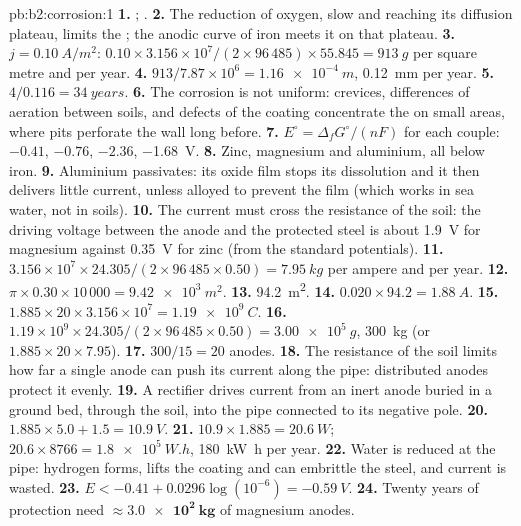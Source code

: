 \begin{solution}{pb:b2:corrosion:1}
\textbf{1.} ; .
\textbf{2.} The reduction of oxygen, slow and reaching its diffusion plateau,
limits the ; the anodic curve of iron meets it on that plateau.
\textbf{3.} $j = \qty{0.10}{A/m^2}$: $0.10 \times 3.156 \times 10^7/(2 \times 96\,485)
\times 55.845 = \qty{913}{g}$ per square metre and per year.
\textbf{4.} $913/7.87 \times 10^6 = \qty{1.16e-4}{m}$, \qty{0.12}{mm} per year.
\textbf{5.} $4/0.116 = \qty{34}{years}$.
\textbf{6.} The corrosion is not uniform: crevices, differences of aeration
between soils, and defects of the coating concentrate the  on
small areas, where pits perforate the wall long before.
\textbf{7.} $E^\circ = \Delta_f G^\circ/(nF)$ for each couple:  $-0.41$,  $-0.76$,
 $-2.36$,  \qty{-1.68}{V}.
\textbf{8.} Zinc, magnesium and aluminium, all below iron.
\textbf{9.} Aluminium passivates: its oxide film stops its dissolution and it
then delivers little current, unless alloyed to prevent the film (which works
in sea water, not in soils).
\textbf{10.} The current must cross the resistance of the soil: the driving
voltage between the anode and the protected steel is about \qty{1.9}{V} for
magnesium against \qty{0.35}{V} for zinc (from the standard potentials).
\textbf{11.} $3.156 \times 10^7 \times 24.305/(2 \times 96\,485 \times 0.50) =
\qty{7.95}{kg}$ per ampere and per year.
\textbf{12.} $\pi \times 0.30 \times 10\,000 = \qty{9.42e3}{m^2}$.
\textbf{13.} \qty{94.2}{m^2}.
\textbf{14.} $0.020 \times 94.2 = \qty{1.88}{A}$.
\textbf{15.} $1.885 \times 20 \times 3.156 \times 10^7 = \qty{1.19e9}{C}$.
\textbf{16.} $1.19 \times 10^9 \times 24.305/(2 \times 96\,485 \times 0.50) =
\qty{3.00e5}{g}$, \qty{300}{kg} (or $1.885 \times 20 \times 7.95$).
\textbf{17.} $300/15 = 20$ anodes.
\textbf{18.} The resistance of the soil limits how far a single anode can push
its current along the pipe: distributed anodes protect it evenly.
\textbf{19.} A rectifier drives current from an inert anode buried in a ground
bed, through the soil, into the pipe connected to its negative pole.
\textbf{20.} $1.885 \times 5.0 + 1.5 = \qty{10.9}{V}$.
\textbf{21.} $10.9 \times 1.885 = \qty{20.6}{W}$; $20.6 \times 8766 = \qty{1.8e5}{W.h}$,
\qty{180}{kW.h} per year.
\textbf{22.} Water is reduced at the pipe: hydrogen forms, lifts the coating and
can embrittle the steel, and current is wasted.
\textbf{23.} $E < -0.41 + 0.0296\log(10^{-6}) = \qty{-0.59}{V}$.
\textbf{24.} Twenty years of protection need $\boldsymbol{\approx \qty{3.0e2}{kg}}$
of magnesium anodes.
\end{solution}
